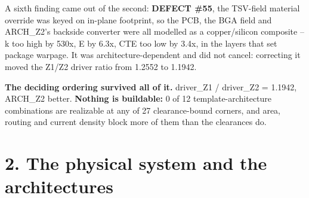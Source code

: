 \documentclass[10pt,]{article}
\begin{document}
A sixth finding came out of the second: \textbf{DEFECT \#55}, the
TSV-field material override was keyed on in-plane footprint, so the PCB,
the BGA field and ARCH\_Z2's backside converter were all modelled as a
copper/silicon composite -- k too high by 530x, E by 6.3x, CTE too low
by 3.4x, in the layers that set package warpage. It was
architecture-dependent and did not cancel: correcting it moved the Z1/Z2
driver ratio from 1.2552 to 1.1942.

\textbf{The deciding ordering survived all of it.} driver\_Z1 /
driver\_Z2 = 1.1942, ARCH\_Z2 better. \textbf{Nothing is buildable:} 0
of 12 template-architecture combinations are realizable at any of 27
clearance-bound corners, and area, routing and current density block
more of them than the clearances do.

\newpage

\hypertarget{the-physical-system-and-the-architectures}{%
\section{2. The physical system and the
architectures}\label{the-physical-system-and-the-architectures}}
\end{document}
